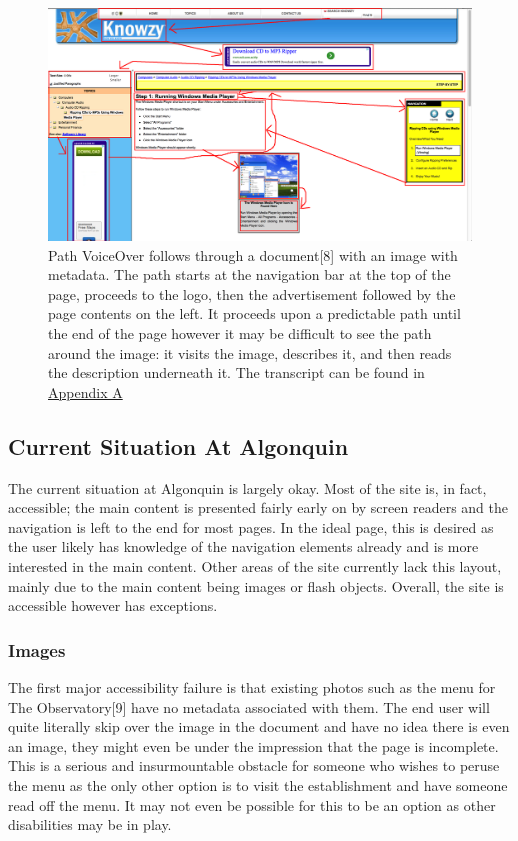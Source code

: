 \documentclass[]{article}
\begin{document}
\begin{figure}[htbp]
\centering
\includegraphics{win_player_vo_path.png}
\caption{Path VoiceOver follows through a document{[}8{]} with an image
with metadata. The path starts at the navigation bar at the top of the
page, proceeds to the logo, then the advertisement followed by the page
contents on the left. It proceeds upon a predictable path until the end
of the page however it may be difficult to see the path around the
image: it visits the image, describes it, and then reads the description
underneath it. The transcript can be found in
\hyperref[transcript-of-an-accessible-page-with-an-image]{Appendix A}
\label{winplayer}}
\end{figure}

\subsection{Current Situation At
Algonquin}\label{current-situation-at-algonquin}

The current situation at Algonquin is largely okay. Most of the site is,
in fact, accessible; the main content is presented fairly early on by
screen readers and the navigation is left to the end for most pages. In
the ideal page, this is desired as the user likely has knowledge of the
navigation elements already and is more interested in the main content.
Other areas of the site currently lack this layout, mainly due to the
main content being images or flash objects. Overall, the site is
accessible however has exceptions.

\subsubsection{Images}\label{images}

The first major accessibility failure is that existing photos such as
the menu for The Observatory{[}9{]} have no metadata associated with
them. The end user will quite literally skip over the image in the
document and have no idea there is even an image, they might even be
under the impression that the page is incomplete. This is a serious and
insurmountable obstacle for someone who wishes to peruse the menu as the
only other option is to visit the establishment and have someone read
off the menu. It may not even be possible for this to be an option as
other disabilities may be in play.
\end{document}
